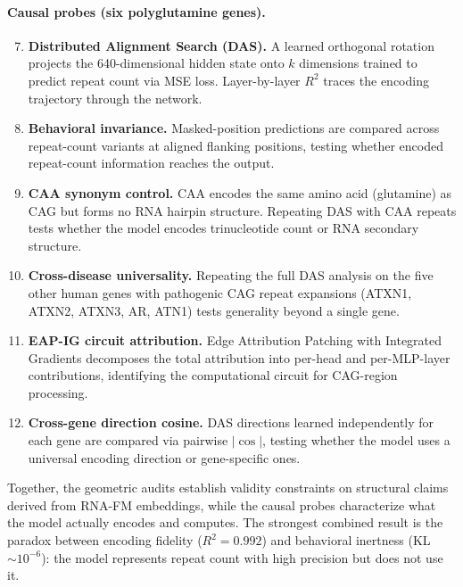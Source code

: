 \documentclass[11pt]{article}
\begin{document}
\paragraph{Causal probes (six polyglutamine genes).}
\begin{enumerate}
\setcounter{enumi}{6}
\item \textbf{Distributed Alignment Search (DAS).} A learned orthogonal
  rotation projects the 640-dimensional hidden state onto $k$ dimensions
  trained to predict repeat count via MSE loss. Layer-by-layer $R^2$
  traces the encoding trajectory through the network.

\item \textbf{Behavioral invariance.} Masked-position predictions are
  compared across repeat-count variants at aligned flanking positions,
  testing whether encoded repeat-count information reaches the output.

\item \textbf{CAA synonym control.} CAA encodes the same amino acid
  (glutamine) as CAG but forms no RNA hairpin structure. Repeating DAS
  with CAA repeats tests whether the model encodes trinucleotide count
  or RNA secondary structure.

\item \textbf{Cross-disease universality.} Repeating the full DAS
  analysis on the five other human genes with pathogenic CAG repeat
  expansions (ATXN1, ATXN2, ATXN3, AR, ATN1) tests generality beyond
  a single gene.

\item \textbf{EAP-IG circuit attribution.} Edge Attribution Patching
  with Integrated Gradients decomposes the total attribution into
  per-head and per-MLP-layer contributions, identifying the computational
  circuit for CAG-region processing.

\item \textbf{Cross-gene direction cosine.} DAS directions learned
  independently for each gene are compared via pairwise $|\cos|$,
  testing whether the model uses a universal encoding direction or
  gene-specific ones.
\end{enumerate}

Together, the geometric audits establish validity constraints on
structural claims derived from RNA-FM embeddings, while the causal
probes characterize what the model actually encodes and computes.
The strongest combined result is the paradox between encoding fidelity
($R^2 = 0.992$) and behavioral inertness (KL $\sim 10^{-6}$): the
model represents repeat count with high precision but does not use it.
\end{document}
